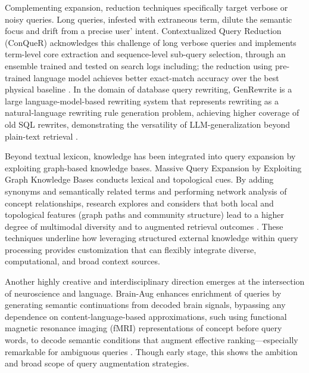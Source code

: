 \documentclass[11pt]{article}
\begin{document}
Complementing expansion, reduction techniques specifically target verbose or noisy queries. Long queries, infested with extraneous term, dilute the semantic focus and drift from a precise user' intent. Contextualized Query Reduction (ConQueR) acknowledges this challenge of long verbose queries and implements term-level core extraction and sequence-level sub-query selection, through an ensemble trained and tested on search logs including; the reduction using pre-trained language model achieves better exact-match accuracy over the best physical baseline \cite{ref32}. In the domain of database query rewriting, GenRewrite is a large language-model-based rewriting system that represents rewriting as a natural-language rewriting rule generation problem, achieving higher coverage of old SQL rewrites, demonstrating the versatility of LLM-generalization beyond plain-text retrieval \cite{ref33}.

Beyond textual lexicon, knowledge has been integrated into query expansion by exploiting graph-based knowledge bases. Massive Query Expansion by Exploiting Graph Knowledge Bases conducts lexical and topological cues. By adding synonyms and semantically related terms and performing network analysis of concept relationships, research explores and considers that both local and topological features (graph paths and community structure) lead to a higher degree of multimodal diversity and to augmented retrieval outcomes \cite{ref34}. These techniques underline how leveraging structured external knowledge within query processing provides customization that can flexibly integrate diverse, computational, and broad context sources.

Another highly creative and interdisciplinary direction emerges at the intersection of neuroscience and language. Brain-Aug enhances enrichment of queries by generating semantic continuations from decoded brain signals, bypassing any dependence on content-language-based approximations, such using functional magnetic resonance imaging (fMRI) representations of concept before query words, to decode semantic conditions that augment effective ranking---especially remarkable for ambiguous queries \cite{ref35}. Though early stage, this shows the ambition and broad scope of query augmentation strategies.
\end{document}
